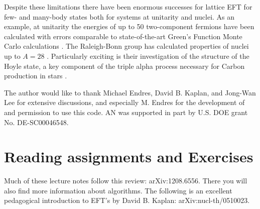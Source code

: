 Despite these limitations there have been enormous successes for lattice EFT for few- and many-body states both for systems at unitarity and nuclei. As an example, at unitarity the energies of up to 50 two-component fermions have been calculated with errors comparable to state-of-the-art Green's Function Monte Carlo calculations \cite{EKLN1,EKLN2,EKLN3,EKLN4,LEKN1,NEKL1}. The Raleigh-Bonn group has calculated properties of nuclei up to $A=28$ \cite{Epelbaum:2010xt,Epelbaum:2009pd,Epelbaum:2013paa,Lahde:2013kma,Lahde:2013uqa}. Particularly exciting is their investigation of the structure of the Hoyle state, a key component of the triple alpha process necessary for Carbon production in stars \cite{Epelbaum:2011md,Epelbaum:2012qn,Epelbaum:2012iu,Epelbaum:2013wla,Lahde:2014bna}. 

\begin{acknowledgement}
The author would like to thank Michael Endres, David B. Kaplan, and Jong-Wan Lee for extensive discussions, and especially M. Endres for the development of and permission to use this code. AN was supported in part by U.S. DOE grant No. DE-SC00046548. 
\end{acknowledgement}

\section{Reading assignments and Exercises}

\begin{prob}
Much of these lecture notes follow this review: arXiv:1208.6556. There you will also find more information about algorithms. The following is an excellent pedagogical introduction to EFT's by David B. Kaplan: arXiv:nucl-th/0510023.
\end{prob}

